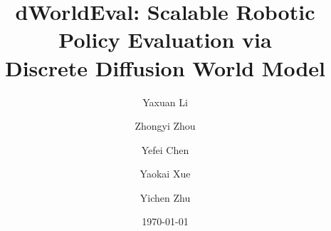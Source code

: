 \documentclass[]{arxiv_article}
\title{dWorldEval: Scalable Robotic Policy Evaluation via \\ Discrete Diffusion World Model}
\author[1]{Yaxuan Li}{}
\author[1]{Zhongyi Zhou}{}
\author[1]{Yefei Chen}{}
\author[1]{Yaokai Xue}{}
\author[2]{Yichen Zhu}{}
\affiliation[1]{Current Robotics}
\affiliation[2]{University of Toronto}
\date{\today}
\begin{document}
\begingroup
\hypersetup{linkcolor=black}
\maketitle
\endgroup













\clearpage



\clearpage

\begin{appendices}
     
\end{appendices}
\end{document}
